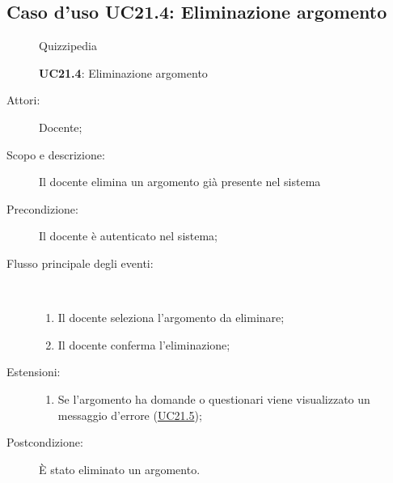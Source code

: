 \subsection{Caso d'uso UC21.4: Eliminazione argomento}
	\begin{figure}[H]
		\centering
		\begin{resizedtikzpicture}{\textwidth}
		\begin{umlsystem}[x=0, fill=lightgray!20]{Quizzipedia}
		\end{umlsystem}
		\end{resizedtikzpicture}
		\caption{\textbf{UC21.4}: Eliminazione argomento}
		\label{UC21.4}
	\end{figure}
\begin{description}
\item[Attori:] Docente;
\item[Scopo e descrizione:] Il docente elimina un argomento già presente nel sistema
      \item[Precondizione:] Il docente è autenticato nel sistema;

        \item[Flusso principale degli eventi:] \ 
 \begin{enumerate}
          \item Il docente seleziona l'argomento da eliminare;
          \item Il docente conferma l'eliminazione;

      \end{enumerate}
    \item[Estensioni:]
      \begin{enumerate}
          \item Se l'argomento ha domande o questionari viene visualizzato un messaggio d'errore (\hyperlink{UC21.5}{UC21.5});

      \end{enumerate}
    \item[Postcondizione:] È stato eliminato un argomento.
  \end{description}
\hypertarget{UC21.5}{}
